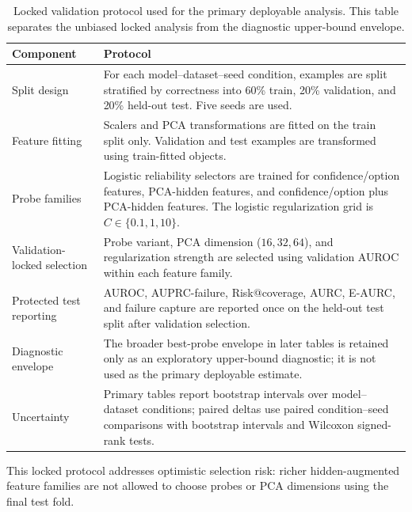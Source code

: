 
\begin{table}[t]
\centering
\small
\caption{Locked validation protocol used for the primary deployable analysis. This table separates the unbiased locked analysis from the diagnostic upper-bound envelope.}
\label{tab:locked-protocol}
\begin{threeparttable}
\begin{tabularx}{\textwidth}{p{}X}
\toprule
Component & Protocol \\
\midrule
Split design & For each model--dataset--seed condition, examples are split stratified by correctness into 60\% train, 20\% validation, and 20\% held-out test. Five seeds are used. \\
Feature fitting & Scalers and PCA transformations are fitted on the train split only. Validation and test examples are transformed using train-fitted objects. \\
Probe families & Logistic reliability selectors are trained for confidence/option features, PCA-hidden features, and confidence/option plus PCA-hidden features. The logistic regularization grid is $C\in\{0.1,1,10\}$. \\
Validation-locked selection & Probe variant, PCA dimension ($16,32,64$), and regularization strength are selected using validation AUROC within each feature family. \\
Protected test reporting & AUROC, AUPRC-failure, Risk@coverage, AURC, E-AURC, and failure capture are reported once on the held-out test split after validation selection. \\
Diagnostic envelope & The broader best-probe envelope in later tables is retained only as an exploratory upper-bound diagnostic; it is not used as the primary deployable estimate. \\
Uncertainty & Primary tables report bootstrap intervals over model--dataset conditions; paired deltas use paired condition--seed comparisons with bootstrap intervals and Wilcoxon signed-rank tests. \\
\bottomrule
\end{tabularx}
\begin{tablenotes}[flushleft]\footnotesize\item This locked protocol addresses optimistic selection risk: richer hidden-augmented feature families are not allowed to choose probes or PCA dimensions using the final test fold.\end{tablenotes}
\end{threeparttable}
\end{table}
